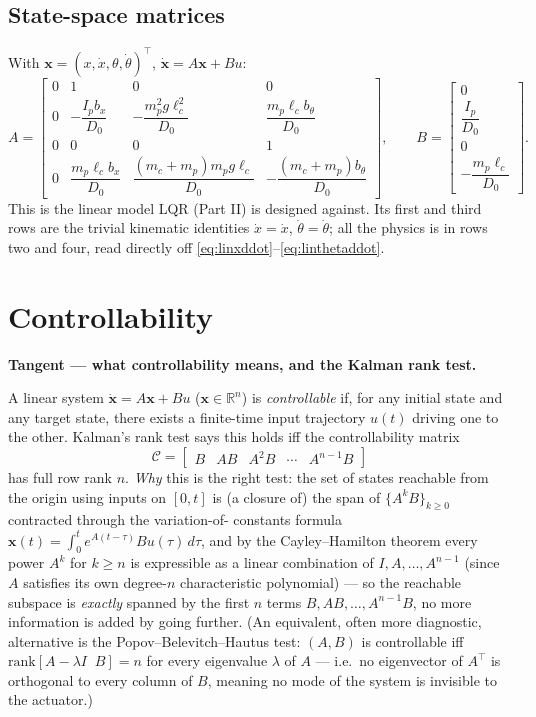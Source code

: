 \documentclass[11pt]{article}
\newenvironment{tangent}[1]{%
  \par\smallskip\noindent\hrulefill\par
  \noindent\textbf{Tangent — #1.}\par\smallskip
  \begingroup\itshape
}{%
  \endgroup
  \par\noindent\hrulefill\par\smallskip
}
\newcommand{\mb}[1]{\mathbf{#1}}
\begin{document}
\subsection{State-space matrices}
With $\mb x = (x,\dot x,\theta,\dot\theta)^\top$, $\dot{\mb x} =
A\mb x + Bu$:
\begin{equation}
  A = \begin{bmatrix}
    0 & 1 & 0 & 0 \\[2pt]
    0 & -\dfrac{I_p b_x}{D_0} & -\dfrac{m_p^2 g\ell_c^2}{D_0} &
      \dfrac{m_p\ell_c b_\theta}{D_0} \\[10pt]
    0 & 0 & 0 & 1 \\[2pt]
    0 & \dfrac{m_p\ell_c b_x}{D_0} & \dfrac{(m_c+m_p)m_p g\ell_c}{D_0} &
      -\dfrac{(m_c+m_p)b_\theta}{D_0}
  \end{bmatrix}, \qquad
  B = \begin{bmatrix} 0 \\[2pt] \dfrac{I_p}{D_0} \\[6pt] 0 \\[2pt]
  -\dfrac{m_p\ell_c}{D_0} \end{bmatrix}. \label{eq:AB}
\end{equation}
This is the linear model LQR (Part II) is designed against. Its first and
third rows are the trivial kinematic identities $\dot x=\dot x$,
$\dot\theta=\dot\theta$; all the physics is in rows two and four,
read directly off \eqref{eq:linxddot}--\eqref{eq:linthetaddot}.

\section{Controllability}

\begin{tangent}{what controllability means, and the Kalman rank test}
A linear system $\dot{\mb x}=A\mb x+Bu$ ($\mb x\in\mathbb R^n$) is
\emph{controllable} if, for any initial state and any target state, there
exists a finite-time input trajectory $u(t)$ driving one to the other.
Kalman's rank test says this holds iff the controllability matrix
\[
  \mathcal C = \begin{bmatrix} B & AB & A^2B & \cdots & A^{n-1}B
  \end{bmatrix}
\]
has full row rank $n$. \emph{Why} this is the right test: the set of
states reachable from the origin using inputs on $[0,t]$ is (a closure of)
the span of $\{A^kB\}_{k\ge0}$ contracted through the variation-of-
constants formula $\mb x(t)=\int_0^t e^{A(t-\tau)}Bu(\tau)\,d\tau$, and by
the Cayley--Hamilton theorem every power $A^k$ for $k\ge n$ is expressible
as a linear combination of $I,A,\dots,A^{n-1}$ (since $A$ satisfies its own
degree-$n$ characteristic polynomial) — so the reachable subspace is
\emph{exactly} spanned by the first $n$ terms $B,AB,\dots,A^{n-1}B$, no
more information is added by going further. (An equivalent, often more
diagnostic, alternative is the Popov--Belevitch--Hautus test: $(A,B)$ is
controllable iff $\mathrm{rank}[A-\lambda I \;\; B] = n$ for every
eigenvalue $\lambda$ of $A$ — i.e.\ no eigenvector of $A^\top$ is
orthogonal to every column of $B$, meaning no mode of the system is
invisible to the actuator.)
\end{tangent}
\end{document}
